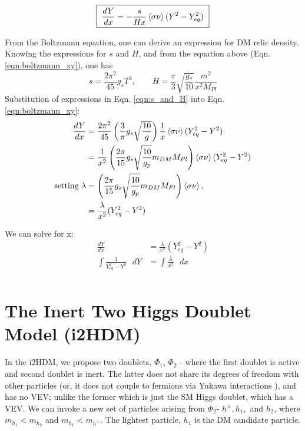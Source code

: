\documentclass[12pt]{article}
\begin{document}
\begin{equation}
    \boxed{\text{ }\frac{dY}{dx} = -\frac{s}{Hx}\braket{\sigma\nu}(Y^2 - Y^2_{eq})\text{ }}
    \label{eqn:boltzmann_xy}
\end{equation}

From the Boltzmann equation, one can derive an expression for DM relic density. Knowing the expressions for $s$ and $H$, and from the equation above (Eqn. \ref{eqn:boltzmann_xy}), one has
\begin{equation}
    s = \frac{2 \pi^2}{45}{g_s}T^3, \qquad 
    H = \frac{\pi}{3}\sqrt{\frac{g_*}{10}}\frac{m^2}{x^2 M_{Pl}}
    \label{eqn:s_and_H}
\end{equation}
Substitution of expressions in Eqn. \ref{eqn:s_and_H} into Eqn. \ref{eqn:boltzmann_xy}:
\begin{equation}
    \begin{split}
        \frac{dY}{dx} &= \frac{2\pi^2}{45}\left(\frac{3}{\pi}g_s\sqrt{\frac{10}{g}}\right)\frac{1}{x}\braket{\sigma \nu}(Y_{eq}^2 - Y^2) \\
        &= \frac{1}{x^2}\left(\frac{2 \pi}{15}g_s\sqrt{\frac{10}{g_p}}m_{DM}M_{Pl}\right)\braket{\sigma \nu}(Y_{eq}^2 - Y^2) \\
        \text{setting } \lambda &= \left(\frac{2 \pi}{15}g_s\sqrt{\frac{10}{g_p}}m_{DM}M_{Pl}\right)\braket{\sigma \nu}, \\
        &= \frac{\lambda}{x^2}(Y_{eq}^2 - Y^2)
    \end{split}
\end{equation}

We can solve for x:
\begin{equation}
    \begin{split}
        \frac{dY}{dx} &= \frac{\lambda}{x^2} (Y_{eq}^2 - Y^2)
        \\\int \frac{1}{Y_{eq}^2 - Y^2}\text{ } dY &= \int\frac{\lambda}{x^2}\text{ } dx
        \\ 
    \end{split}
\end{equation}
\section{The Inert Two Higgs Doublet Model (i2HDM)}
\label{sec:i2HDM}
In the i2HDM, we propose two doublets, $\Phi_1$, $\Phi_2$ - where the first doublet is active and second doublet is inert. The latter does not share its degrees of freedom with other particles (or, it does not couple to fermions via Yukawa interactions \cite{Belyaev_2022}), and has no VEV; unlike the former which is just the SM Higgs doublet, which has a VEV. We can invoke a new set of particles arising from $\Phi_2$- $h^\pm, h_1,$ and $h_2$, where $m_{h_1} < m_{h_2}$ and $m_{h_1} < m_{h^\pm}$. The lightest particle, $h_1$ is the DM candidate particle.
\end{document}
